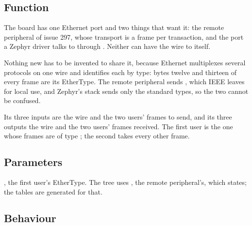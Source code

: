 
%
{}

\subsection*{Function}

The board has one Ethernet port and two things that want it: the
remote peripheral of issue 297, whose transport is a frame per
transaction, and the port a Zephyr driver talks to through
. Neither can have the wire to itself.

Nothing new has to be invented to share it, because Ethernet
multiplexes several protocols on one wire and identifies each by type:
bytes twelve and thirteen of every frame are its EtherType. The remote
peripheral sends , which IEEE leaves for local use, and
Zephyr's stack sends only the standard types, so the two cannot be
confused.

Its three inputs are the wire and the two users' frames to send, and
its three outputs the wire and the two users' frames received. The
first user is the one whose frames are of type ; the
second takes every other frame.

\subsection*{Parameters}

, the first user's EtherType. The tree uses
, the remote peripheral's, which
 states; the tables are generated for
that.


\subsection*{Behaviour}

